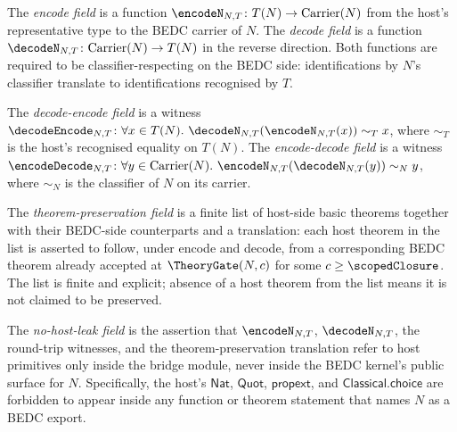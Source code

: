 \begin{definition}
\label{def:acceptance-bridge-encode}
\label{def:acceptance-bridge-decode}
The \emph{encode field} is a function $\encodeN_{N,T} \colon T(N) \to \mathrm{Carrier}(N)$ from the host's representative type to the BEDC carrier of $N$. The \emph{decode field} is a function $\decodeN_{N,T} \colon \mathrm{Carrier}(N) \to T(N)$ in the reverse direction. Both functions are required to be classifier-respecting on the BEDC side: identifications by $N$'s classifier translate to identifications recognised by $T$.
\end{definition}

\begin{definition}
\label{def:acceptance-bridge-roundtrips}
The \emph{decode-encode field} is a witness $\decodeEncode_{N,T} \colon \forall x \in T(N).\ \decodeN_{N,T}(\encodeN_{N,T}(x)) \sim_{T} x$, where $\sim_T$ is the host's recognised equality on $T(N)$. The \emph{encode-decode field} is a witness $\encodeDecode_{N,T} \colon \forall y \in \mathrm{Carrier}(N).\ \encodeN_{N,T}(\decodeN_{N,T}(y)) \sim_{N} y$, where $\sim_N$ is the classifier of $N$ on its carrier.
\end{definition}

\begin{definition}
\label{def:acceptance-bridge-theorem-preservation}
The \emph{theorem-preservation field} is a finite list of host-side basic theorems together with their BEDC-side counterparts and a translation: each host theorem in the list is asserted to follow, under encode and decode, from a corresponding BEDC theorem already accepted at $\TheoryGate(N, c)$ for some $c \ge \scopedClosure$. The list is finite and explicit; absence of a host theorem from the list means it is not claimed to be preserved.
\end{definition}

\begin{definition}
\label{def:acceptance-bridge-no-host-leak}
The \emph{no-host-leak field} is the assertion that $\encodeN_{N,T}$, $\decodeN_{N,T}$, the round-trip witnesses, and the theorem-preservation translation refer to host primitives only inside the bridge module, never inside the BEDC kernel's public surface for $N$. Specifically, the host's $\mathsf{Nat}$, $\mathsf{Quot}$, $\mathsf{propext}$, and $\mathsf{Classical.choice}$ are forbidden to appear inside any function or theorem statement that names $N$ as a BEDC export.
\end{definition}

